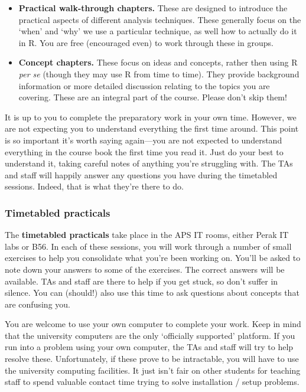 \documentclass[]{book}
\begin{document}
\begin{itemize}
\item
  \textbf{Practical walk-through chapters.} These are designed to
  introduce the practical aspects of different analysis techniques.
  These generally focus on the `when' and `why' we use a particular
  technique, as well how to actually do it in R. You are free
  (encouraged even) to work through these in groups.
\item
  \textbf{Concept chapters.} These focus on ideas and concepts, rather
  then using R \emph{per se} (though they may use R from time to time).
  They provide background information or more detailed discussion
  relating to the topics you are covering. These are an integral part of
  the course. Please don't skip them!
\end{itemize}

It is up to you to complete the preparatory work in your own time.
However, we are not expecting you to understand everything the first
time around. This point is so important it's worth saying again---you
are not expected to understand everything in the course book the first
time you read it. Just do your best to understand it, taking careful
notes of anything you're struggling with. The TAs and staff will happily
answer any questions you have during the timetabled sessions. Indeed,
that is what they're there to do.

\subsubsection{Timetabled practicals}\label{timetabled-practicals}

The \textbf{timetabled practicals} take place in the APS IT rooms,
either Perak IT labs or B56. In each of these sessions, you will work
through a number of small exercises to help you consolidate what you're
been working on. You'll be asked to note down your answers to some of
the exercises. The correct answers will be available. TAs and staff are
there to help if you get stuck, so don't suffer in silence. You can
(should!) also use this time to ask questions about concepts that are
confusing you.

You are welcome to use your own computer to complete your work. Keep in
mind that the university computers are the only `officially supported'
platform. If you run into a problem using your own computer, the TAs and
staff will try to help resolve these. Unfortunately, if these prove to
be intractable, you will have to use the university computing
facilities. It just isn't fair on other students for teaching staff to
spend valuable contact time trying to solve installation / setup
problems.
\end{document}
